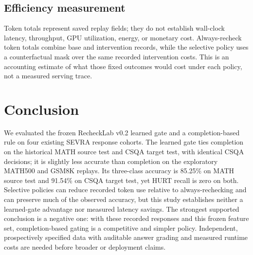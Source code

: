 \documentclass[conference]{IEEEtran}
\begin{document}
\subsection{Efficiency measurement}
Token totals represent saved replay fields; they do not establish wall-clock latency, throughput, GPU utilization, energy, or monetary cost. Always-recheck token totals combine base and intervention records, while the selective policy uses a counterfactual mask over the same recorded intervention costs. This is an accounting estimate of what those fixed outcomes would cost under each policy, not a measured serving trace.

\section{Conclusion}
We evaluated the frozen RecheckLab v0.2 learned gate and a completion-based rule on four existing SEVRA response cohorts. The learned gate ties completion on the historical MATH source test and CSQA target test, with identical CSQA decisions; it is slightly less accurate than completion on the exploratory MATH500 and GSM8K replays. Its three-class accuracy is 85.25\% on MATH source test and 91.54\% on CSQA target test, yet HURT recall is zero on both. Selective policies can reduce recorded token use relative to always-rechecking and can preserve much of the observed accuracy, but this study establishes neither a learned-gate advantage nor measured latency savings. The strongest supported conclusion is a negative one: with these recorded responses and this frozen feature set, completion-based gating is a competitive and simpler policy. Independent, prospectively specified data with auditable answer grading and measured runtime costs are needed before broader or deployment claims.


\balance

\end{document}
